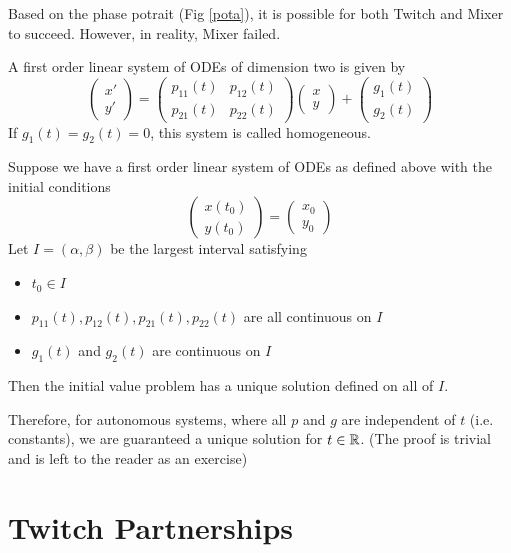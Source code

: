 \documentclass[12pt]{article}
\begin{document}
Based on the phase potrait (Fig \ref{pota}), it is possible for both Twitch and Mixer to succeed. However, in reality, Mixer failed.

\begin{defn}
	A first order linear system of ODEs of dimension two is given by
	$$\begin{pmatrix} x' \\ y' \end{pmatrix} = \begin{pmatrix} p_{11}(t) & p_{12}(t) \\ p_{21}(t) & p_{22}(t) \end{pmatrix} \begin{pmatrix} x \\ y \end{pmatrix} + \begin{pmatrix} g_1(t) \\ g_2(t) \end{pmatrix}$$
	If $g_1(t) = g_2(t) = 0$, this system is called homogeneous.
\end{defn}

\begin{thm}
	Suppose we have a first order linear system of ODEs as defined above with the initial conditions
	$$\begin{pmatrix} x(t_0) \\ y(t_0) \end{pmatrix} = \begin{pmatrix} x_0 \\ y_0 \end{pmatrix}$$
	Let $I = (\alpha, \beta)$ be the largest interval satisfying
	\begin{itemize}
		\item $t_0 \in I$
		\item $p_{11}(t), p_{12}(t), p_{21}(t), p_{22}(t)$ are all continuous on $I$
		\item $g_1(t)$ and $g_2(t)$ are continuous on $I$
	\end{itemize}
	Then the initial value problem has a unique solution defined on all of $I$.
\end{thm}

Therefore, for autonomous systems, where all $p$ and $g$ are independent of $t$ (i.e. constants), we are guaranteed a unique solution for $t \in \mathbb{R}$. (The proof is trivial and is left to the reader as an exercise)

\section{Twitch Partnerships}
\end{document}
